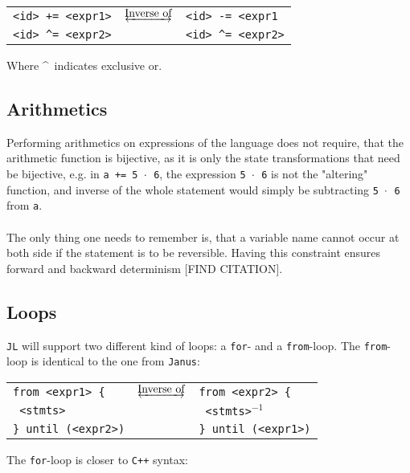 \begin{table*}[h]
    \centering
    \begin{tabular}{lcl}
        \texttt{<id> += <expr1>} & $\underleftrightarrow{\text{Inverse of}}$ & \texttt{<id> -= <expr1} \\
        \texttt{<id> \textasciicircum= <expr2>} & & \texttt{<id> \textasciicircum= <expr2>}
    \end{tabular}
\end{table*}
\noindent
Where \textasciicircum ~indicates exclusive or.

\subsection{Arithmetics}
Performing arithmetics on expressions of the language does not require, that the arithmetic function
is bijective, as it is only the state transformations that need be bijective, e.g. in
\texttt{a += 5 $\cdot$ 6}, the expression \texttt{5 $\cdot$ 6} is not the "altering" function, and
inverse of the whole statement would simply be subtracting \texttt{5 $\cdot$ 6} from \texttt{a}.
\\
\\
The only thing one needs to remember is, that a variable name cannot occur at both side if the
statement is to be reversible. Having this constraint ensures forward and backward determinism
[FIND CITATION].

\subsection{Loops}
\texttt{JL} will support two different kind of loops: a \texttt{for}- and a \texttt{from}-loop.
The \texttt{from}-loop is identical to the one from \texttt{Janus}:
\newpage
\begin{table*}[!h]
    \centering
    \begin{tabular}{lcl}
        \texttt{from <expr1> \{} & $\underleftrightarrow{\text{Inverse of}}$ & \texttt{from <expr2> \{ }\\
        \texttt{ <stmts>} && \texttt{ <stmts>$^{-1}$} \\
        \texttt{\} until (<expr2>)} && \texttt{\} until (<expr1>)} 
    \end{tabular}
\end{table*}
\noindent
The \texttt{for}-loop is closer to \texttt{C++} syntax:

